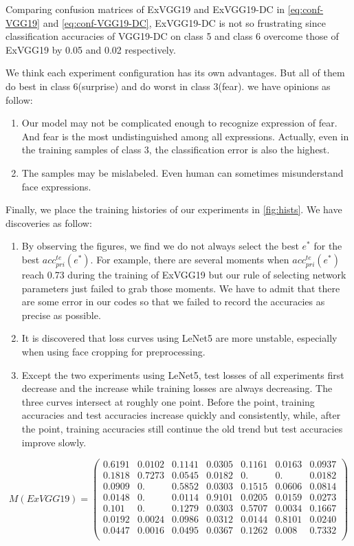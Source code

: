 \documentclass[journal, onecolumn]{IEEEtran}
\begin{document}
Comparing confusion matrices of ExVGG19 and ExVGG19-DC in \ref{eq:conf-VGG19} and \ref{eq:conf-VGG19-DC}, ExVGG19-DC is not so frustrating since classification accuracies of VGG19-DC on class 5 and class 6 overcome those of ExVGG19 by 0.05 and 0.02 respectively.

We think each experiment configuration has its own advantages. But all of them do best in class 6(surprise) and do worst in class 3(fear). we have opinions as follow:
\begin{enumerate}
  \item Our model may not be complicated enough to recognize expression of fear. And fear is the most undistinguished among all expressions. Actually, even in the training samples of class 3, the classification error is also the highest.
  \item The samples may be mislabeled. Even human can sometimes misunderstand face expressions.
\end{enumerate}

Finally, we place the training histories of our experiments in \ref{fig:hists}. We have discoveries as follow:
\begin{enumerate}
  \item  By observing the figures, we find we do not always select the best $e^*$ for the best $acc^{te}_{pri}(e^*)$. For example, there are several moments when $acc^{te}_{pri}(e^*)$ reach 0.73 during the training of ExVGG19 but our rule of selecting network parameters just failed to grab those moments. We have to admit that there are some error in our codes so that we failed to record the accuracies as precise as possible.
  \item It is discovered that loss curves using LeNet5 are more unstable, especially when using face cropping for preprocessing.
  \item Except the two experiments using LeNet5, test losses of all experiments first decrease and the increase while training losses are always decreasing. The three curves intersect at roughly one point. Before the point, training accuracies and test accuracies increase quickly and consistently, while, after the point, training accuracies still continue the old trend but test accuracies improve slowly.
\end{enumerate}

\begin{equation}
\label{eq:conf-VGG19}
M(ExVGG19)=
\left(
  \begin{array}{ccccccc}
    0.6191&0.0102&0.1141&0.0305&0.1161&0.0163&0.0937\\
    0.1818&0.7273&0.0545&0.0182&0.&0.&0.0182\\
    0.0909&0.&0.5852&0.0303&0.1515&0.0606&0.0814\\
    0.0148&0.&0.0114&0.9101&0.0205&0.0159&0.0273\\
    0.101&0.&0.1279&0.0303&0.5707&0.0034&0.1667\\
    0.0192&0.0024&0.0986&0.0312&0.0144&0.8101&0.0240\\
    0.0447&0.0016&0.0495&0.0367&0.1262&0.008&0.7332\\
  \end{array}
\right)
\end{equation}
\end{document}
